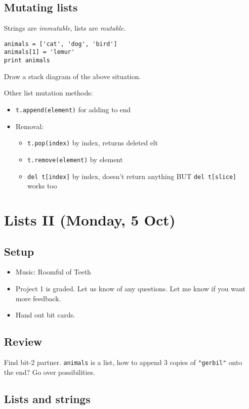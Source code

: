 \documentclass{article}
\begin{document}
\subsection*{Mutating lists}

Strings are \emph{immutable}, lists are \emph{mutable}.

\begin{verbatim}
animals = ['cat', 'dog', 'bird']
animals[1] = 'lemur'
print animals
\end{verbatim}
Draw a stack diagram of the above situation.

Other list mutation methods:
\begin{itemize}
\item \verb|t.append(element)| for adding to end
\item Removal:
  \begin{itemize}
  \item \verb|t.pop(index)| by index, returns deleted elt
  \item \verb|t.remove(element)| by element
  \item \verb|del t[index]| by index, doesn't return anything BUT
	\verb|del t[slice]| works too
  \end{itemize}
\end{itemize}

\section*{Lists II (Monday, 5 Oct)}

\subsection*{Setup}
\begin{itemize}
\item Music: Roomful of Teeth
\item Project 1 is graded.  Let us know of any questions.  Let me know
  if you want more feedback.
\item Hand out bit cards.
\end{itemize}

\subsection*{Review}
Find bit-2 partner. \verb|animals| is a list, how to append 3 copies
of \verb|"gerbil"| onto the end?  Go over possibilities.

\subsection*{Lists and strings}
\end{document}
